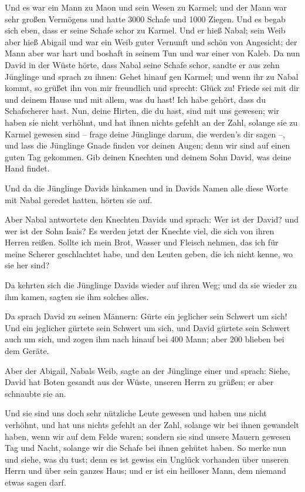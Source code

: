  Und es war ein Mann zu Maon und sein Wesen zu Karmel; und
der Mann war sehr großen Vermögens und hatte 3000 Schafe und 1000
Ziegen. Und es begab sich eben, dass er seine Schafe schor zu Karmel.
 Und er hieß Nabal; sein Weib aber hieß Abigail und war
ein Weib guter Vernunft und schön von Angesicht; der Mann aber war hart
und boshaft in seinem Tun und war einer von Kaleb.  Da nun
David in der Wüste hörte, dass Nabal seine Schafe schor, 
sandte er aus zehn Jünglinge und sprach zu ihnen: Gehet hinauf gen
Karmel; und wenn ihr zu Nabal kommt, so grüßet ihn von mir freundlich
 und sprecht: Glück zu! Friede sei mit dir und deinem
Hause und mit allem, was du hast!  Ich habe gehört, dass
du Schafscherer hast. Nun, deine Hirten, die du hast, sind mit uns
gewesen; wir haben sie nicht verhöhnt, und hat ihnen nichts gefehlt an
der Zahl, solange sie zu Karmel gewesen sind --  frage
deine Jünglinge darum, die werden's dir sagen --, und lass die Jünglinge
Gnade finden vor deinen Augen; denn wir sind auf einen guten Tag
gekommen. Gib deinen Knechten und deinem Sohn David, was deine Hand
findet.

 Und da die Jünglinge Davids hinkamen und in Davids Namen
alle diese Worte mit Nabal geredet hatten, hörten sie auf.

 Aber Nabal antwortete den Knechten Davids und sprach:
Wer ist der David? und wer ist der Sohn Isais? Es werden jetzt der
Knechte viel, die sich von ihren Herren reißen.  Sollte
ich mein Brot, Wasser und Fleisch nehmen, das ich für meine Scherer
geschlachtet habe, und den Leuten geben, die ich nicht kenne, wo sie her
sind?

 Da kehrten sich die Jünglinge Davids wieder auf ihren
Weg; und da sie wieder zu ihm kamen, sagten sie ihm solches alles.

 Da sprach David zu seinen Männern: Gürte ein jeglicher
sein Schwert um sich! Und ein jeglicher gürtete sein Schwert um sich,
und David gürtete sein Schwert auch um sich, und zogen ihm nach hinauf
bei 400 Mann; aber 200 blieben bei dem Geräte.

 Aber der Abigail, Nabals Weib, sagte an der Jünglinge
einer und sprach: Siehe, David hat Boten gesandt aus der Wüste, unseren
Herrn zu grüßen; er aber schnaubte sie an.

 Und sie sind uns doch sehr nützliche Leute gewesen und
haben uns nicht verhöhnt, und hat uns nichts gefehlt an der Zahl,
solange wir bei ihnen gewandelt haben, wenn wir auf dem Felde waren;
 sondern sie sind unsere Mauern gewesen Tag und Nacht,
solange wir die Schafe bei ihnen gehütet haben.  So merke
nun und siehe, was du tust; denn es ist gewiss ein Unglück vorhanden
über unseren Herrn und über sein ganzes Haus; und er ist ein heilloser
Mann, dem niemand etwas sagen darf.

